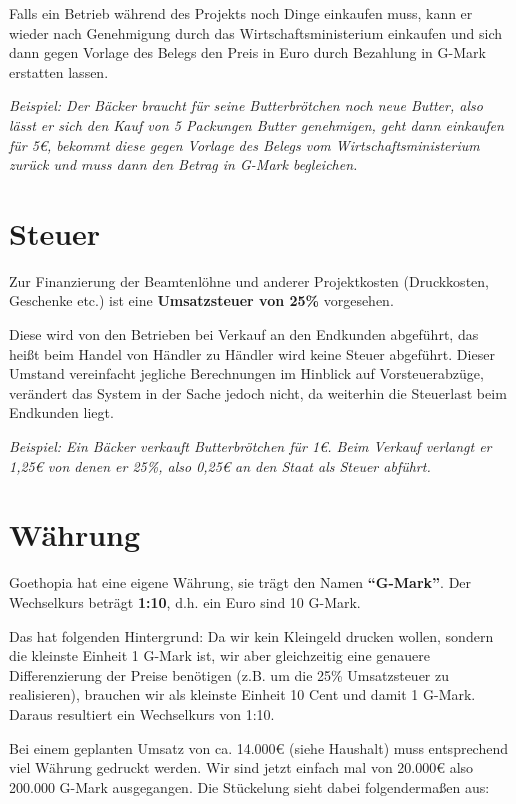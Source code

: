 \documentclass{sasbase}
\begin{document}
Falls ein Betrieb während des Projekts noch Dinge einkaufen muss, kann er wieder nach Genehmigung
durch das Wirtschaftsministerium einkaufen und sich dann gegen Vorlage des Belegs den
Preis in Euro durch Bezahlung in G-Mark erstatten lassen.

\textit{Beispiel: Der Bäcker braucht für seine Butterbrötchen noch neue Butter, also lässt er sich
den Kauf von 5 Packungen Butter genehmigen, geht dann einkaufen für 5€, bekommt diese gegen Vorlage
des Belegs vom Wirtschaftsministerium zurück und muss dann den Betrag in G-Mark begleichen.}

\section{Steuer}

Zur Finanzierung der Beamtenlöhne und anderer Projektkosten (Druckkosten, Geschenke etc.) ist eine
\textbf{Umsatzsteuer von 25\%} vorgesehen.

Diese wird von den Betrieben bei Verkauf an den Endkunden abgeführt, das heißt beim Handel von
Händler zu Händler wird keine Steuer abgeführt.
Dieser Umstand vereinfacht jegliche Berechnungen im Hinblick auf Vorsteuerabzüge, verändert das
System in der Sache jedoch nicht, da weiterhin die Steuerlast beim Endkunden liegt.

\textit{Beispiel: Ein Bäcker verkauft Butterbrötchen für 1€. Beim Verkauf verlangt er 1,25€ von
denen er 25\%, also 0,25€ an den Staat als Steuer abführt.}

\section{Währung}

Goethopia hat eine eigene Währung, sie trägt den Namen \textbf{"`G-Mark"'}. Der Wechselkurs
beträgt \textbf{1:10}, d.h. ein Euro sind 10 G-Mark.

Das hat folgenden Hintergrund: Da wir kein Kleingeld drucken wollen, sondern die kleinste Einheit
1 G-Mark ist, wir aber gleichzeitig eine genauere Differenzierung der Preise benötigen (z.B. um
die 25\% Umsatzsteuer zu realisieren), brauchen wir als kleinste Einheit 10 Cent und damit 1 G-Mark.
Daraus resultiert ein Wechselkurs von 1:10.

Bei einem geplanten Umsatz von ca. 14.000€ (siehe Haushalt) muss entsprechend viel Währung gedruckt
werden. Wir sind jetzt einfach mal von 20.000€ also 200.000 G-Mark ausgegangen.
Die Stückelung sieht dabei folgendermaßen aus:
\end{document}
